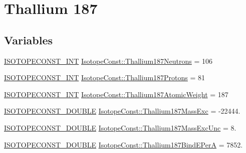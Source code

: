 \hypertarget{group___isotope_const-_thallium-_tl187}{}\section{Thallium 187}
\label{group___isotope_const-_thallium-_tl187}
\subsection*{Variables}
\begin{DoxyCompactItemize}
\item 
\mbox{\hyperlink{group___isotope_const-_macros_ga5f18360b3e99483a35c32d789e62621c}{I\+S\+O\+T\+O\+P\+E\+C\+O\+N\+S\+T\+\_\+\+I\+NT}} \mbox{\hyperlink{group___isotope_const-_thallium-_tl187_ga3200fe447707795b828a452d4189a2a7}{Isotope\+Const\+::\+Thallium187\+Neutrons}} = 106
\item 
\mbox{\hyperlink{group___isotope_const-_macros_ga5f18360b3e99483a35c32d789e62621c}{I\+S\+O\+T\+O\+P\+E\+C\+O\+N\+S\+T\+\_\+\+I\+NT}} \mbox{\hyperlink{group___isotope_const-_thallium-_tl187_ga46f603453d3ac5b3b6baf57992b87656}{Isotope\+Const\+::\+Thallium187\+Protons}} = 81
\item 
\mbox{\hyperlink{group___isotope_const-_macros_ga5f18360b3e99483a35c32d789e62621c}{I\+S\+O\+T\+O\+P\+E\+C\+O\+N\+S\+T\+\_\+\+I\+NT}} \mbox{\hyperlink{group___isotope_const-_thallium-_tl187_ga25de506c0846065d7642b3ab24901345}{Isotope\+Const\+::\+Thallium187\+Atomic\+Weight}} = 187
\item 
\mbox{\hyperlink{group___isotope_const-_macros_ga8f45a7272ce02c0b4c65c44636ed719a}{I\+S\+O\+T\+O\+P\+E\+C\+O\+N\+S\+T\+\_\+\+D\+O\+U\+B\+LE}} \mbox{\hyperlink{group___isotope_const-_thallium-_tl187_gaf4afad8d5b0581b1e4497d282fabcb39}{Isotope\+Const\+::\+Thallium187\+Mass\+Exc}} = -\/22444.
\item 
\mbox{\hyperlink{group___isotope_const-_macros_ga8f45a7272ce02c0b4c65c44636ed719a}{I\+S\+O\+T\+O\+P\+E\+C\+O\+N\+S\+T\+\_\+\+D\+O\+U\+B\+LE}} \mbox{\hyperlink{group___isotope_const-_thallium-_tl187_ga2ecd754876c725dee0c7f9e3f5e7aed1}{Isotope\+Const\+::\+Thallium187\+Mass\+Exc\+Unc}} = 8.
\item 
\mbox{\hyperlink{group___isotope_const-_macros_ga8f45a7272ce02c0b4c65c44636ed719a}{I\+S\+O\+T\+O\+P\+E\+C\+O\+N\+S\+T\+\_\+\+D\+O\+U\+B\+LE}} \mbox{\hyperlink{group___isotope_const-_thallium-_tl187_ga5345a99a3d65c654a973dd0d48a60d9f}{Isotope\+Const\+::\+Thallium187\+Bind\+E\+PerA}} = 7852.
\item 

\end{DoxyCompactItemize}

